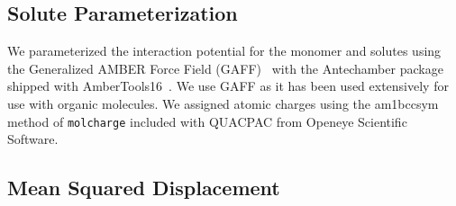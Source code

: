 \documentclass[journal=jpcbfk,manuscript=article]{achemso}
\begin{document}
  \subsection{Solute Parameterization}\label{method:parameterization}
  
  We parameterized the interaction potential for the monomer and solutes using 
  the Generalized AMBER Force Field (GAFF)~\cite{wang_development_2004} with the
  Antechamber package \cite{wang_automatic_2006} shipped with AmberTools16~\cite{case_ambertools16_2016}.
  We use GAFF 
  as it has been used extensively 
  for use with organic molecules.
  We
  assigned atomic charges using the am1bccsym method of \texttt{molcharge} included
  with QUACPAC from Openeye Scientific Software.
  
  \subsection{Mean Squared Displacement}\label{method:MSD}
\end{document}
